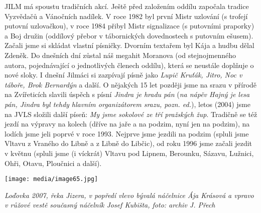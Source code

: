 JILM má spoustu tradičních akcí. Ještě před založením oddílu započala
tradice Vyzvědačů a Vánočních nadílek. V roce 1982 byl první Mistr
uzlování (s trofejí putovní uzlovačkou), v roce 1984 přibyl Mistr
signalizace (s putovními praporky) a Boj družin (oddílový přebor v
tábornických dovednostech s putovním ešusem). Začali jsme si skládat
vlastní písničky. Dvorním textařem byl Kája a hudbu dělal Zdeněk. Do
dnešních dní zůstal náš megahit Moranova (od stejnojmenného autora,
pojednávající o jednotlivých členech oddílu), která se neustále doplňuje
o nové sloky. I dnešní Jilmáci si zazpívají písně jako \emph{Lupič
Kruťák, Jitro, Noc v táboře, Brok Bernardýn} a další. O nějakých 15 let
později jsme na srazu v přírodě na Zvířeticích slavili úspěch s písní
\emph{Jindra je hradu pán} (\emph{na nápěv Hajný je lesa pán, Jindra byl
tehdy hlavním organizátorem srazu, pozn. ed.}), letos (2004) jsme na
JVLS složili další píseň: \emph{My jsme sokolové ze tří pražských žup}.
Tradičně se též jezdí na výpravy na kolech (dříve na jaře a na podzim,
nyní jen na podzim), na lodích jsme jeli poprvé v roce 1993. Nejprve
jsme jezdili na podzim (spluli jsme Vltavu z Vraného do Libně a z Libně
do Libčic), od roku 1996 jsme začali jezdit v květnu (spluli jsme (i
víckrát) Vltavu pod Lipnem, Berounku, Sázavu, Lužnici, Ohři, Otavu,
Ploučnici a další).

\texttt{[image: media/image65.jpg]}

\emph{Loďovka 2007, řeka Jizera, v popředí vlevo bývalá náčelnice Ája
Krásová a vpravo v růžové vestě současný náčelník Josef Kubišta, foto:
archiv J. Přech}

